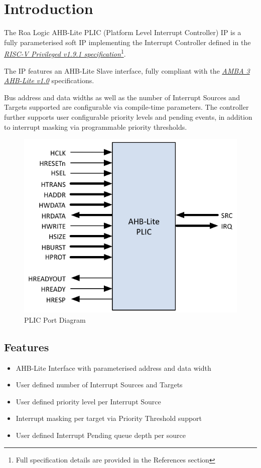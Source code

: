 \chapter{Introduction}

The Roa Logic AHB-Lite PLIC (Platform Level Interrupt Controller) IP is a fully parameterised soft IP implementing the Interrupt Controller defined in the \emph{\href{https://github.com/riscv/riscv-isa-manual/blob/master/release/riscv-privileged-v1.9.1.pdf}{RISC-V Privileged v1.9.1 specification}}\footnote{Full specification details are provided in the References section}.

The IP features an AHB-Lite Slave interface, fully compliant with the \emph{\href{https://www.arm.com/products/system-ip/amba-specifications}{AMBA 3 AHB-Lite v1.0}} specifications. 

Bus address and data widths as well as the number of Interrupt Sources and Targets supported are configurable via compile-time parameters. The controller further supports user configurable priority levels and pending events, in addition to interrupt masking via programmable priority thresholds.

\begin{figure}[!htb]
  \includegraphics{assets/img/plic-ports}
  \caption{PLIC Port Diagram}
  \label{fig:PORTDIAG}
\end{figure}

\section{Features}

\begin{itemize}
	\item
		AHB-Lite Interface with parameterised address and data width
	\item
		User defined number of Interrupt Sources and Targets
	\item
		User defined priority level per Interrupt Source
	\item
		Interrupt masking per target via Priority Threshold support
	\item
		User defined Interrupt Pending queue depth per source
\end{itemize}
